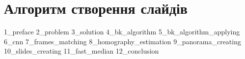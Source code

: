 \chapter{Алгоритм створення слайдів}
{1_preface}
{2_problem}
{3_solution}
{4_bk_algorithm}
{5_bk_algorithm_applying}
{6_cnn}
{7_frames_matching}
{8_homography_estimation}
{9_panorama_creating}
{10_slides_creating}
{11_fast_median}
{12_conclusion}